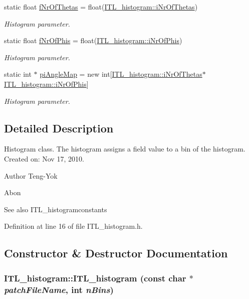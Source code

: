 \begin{DoxyCompactItemize}
static float \hyperlink{classITL__histogram_a693544af37d885b4b52316fd27f0c8af}{fNrOfThetas} = float(\hyperlink{classITL__histogram_a635c7179b23ea13e38258f24582e3e8b}{ITL\_\-histogram::iNrOfThetas})
\begin{DoxyCompactList}\small\item\em Histogram parameter. \item\end{DoxyCompactList}\item 
static float \hyperlink{classITL__histogram_adb7718f57d485c9cb69c4dc91ead14ad}{fNrOfPhis} = float(\hyperlink{classITL__histogram_ac58c7bb82ec5d99ae86223e414d34c26}{ITL\_\-histogram::iNrOfPhis})
\begin{DoxyCompactList}\small\item\em Histogram parameter. \item\end{DoxyCompactList}\item 
static int $\ast$ \hyperlink{classITL__histogram_aafbb8f075bd599b3f4fa8916473b0062}{piAngleMap} = new int\mbox{[}\hyperlink{classITL__histogram_a635c7179b23ea13e38258f24582e3e8b}{ITL\_\-histogram::iNrOfThetas}$\ast$\hyperlink{classITL__histogram_ac58c7bb82ec5d99ae86223e414d34c26}{ITL\_\-histogram::iNrOfPhis}\mbox{]}
\begin{DoxyCompactList}\small\item\em Histogram parameter. \item\end{DoxyCompactList}\end{DoxyCompactItemize}


\subsection{Detailed Description}
Histogram class. The histogram assigns a field value to a bin of the histogram. Created on: Nov 17, 2010. \begin{DoxyAuthor}{Author}
Teng-\/Yok 

Abon 
\end{DoxyAuthor}
\begin{DoxySeeAlso}{See also}
ITL\_\-histogramconstants 
\end{DoxySeeAlso}


Definition at line 16 of file ITL\_\-histogram.h.



\subsection{Constructor \& Destructor Documentation}
\hypertarget{classITL__histogram_a5bbbc427af2d4b960be619fd34b7d272}{
\subsubsection[{ITL\_\-histogram}]{\setlength{\rightskip}{0pt plus 5cm}ITL\_\-histogram::ITL\_\-histogram (const char $\ast$ {\em patchFileName}, \/  int {\em nBins})}}
\label{classITL__histogram_a5bbbc427af2d4b960be619fd34b7d272}


